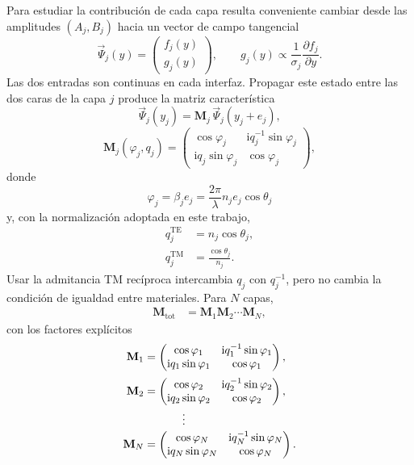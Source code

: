\documentclass[10pt,a4paper]{article}
\newcommand{\ii}{\mathrm{i}}
\newcommand{\M}{\mathbf{M}}
\newcommand{\vPsi}{\vec{\Psi}}
\begin{document}
Para estudiar la contribuci\'on de cada capa resulta conveniente cambiar desde las amplitudes $(A_j,B_j)$ hacia un vector de campo tangencial
\begin{equation}
\vPsi_j(y)=
\begin{pmatrix}
f_j(y)\\[2pt]
g_j(y)
\end{pmatrix},
\qquad
g_j(y)\propto\frac{1}{\sigma_j}\frac{\partial f_j}{\partial y}.
\label{eq:vector-estado}
\end{equation}
Las dos entradas son continuas en cada interfaz. Propagar este estado entre las dos caras de la capa $j$ produce la matriz caracter\'istica
\begin{equation}
\vPsi_j(y_j)=\M_j\,\vPsi_j(y_j+e_j),
\end{equation}
\begin{equation}
\M_j(\varphi_j,q_j)=
\begin{pmatrix}
\cos\varphi_j & \ii q_j^{-1}\sin\varphi_j\\[2pt]
\ii q_j\sin\varphi_j & \cos\varphi_j
\end{pmatrix},
\label{eq:matriz-capa}
\end{equation}
donde
\begin{equation}
\varphi_j=\beta_j e_j
=\frac{2\pi}{\lambda}n_je_j\cos\theta_j
\label{eq:fase}
\end{equation}
y, con la normalizaci\'on adoptada en este trabajo,
\begin{align}
q_j^{\mathrm{TE}}&=n_j\cos\theta_j,
\label{eq:qte}\\
q_j^{\mathrm{TM}}&=\frac{\cos\theta_j}{n_j}.
\label{eq:qtm}
\end{align}
Usar la admitancia TM rec\'iproca intercambia $q_j$ con $q_j^{-1}$, pero no cambia la condici\'on de igualdad entre materiales. Para $N$ capas,
\begin{align}
\M_{\mathrm{tot}}
&=\M_1\M_2\cdots\M_N,
\label{eq:producto-total}
\end{align}
con los factores expl\'icitos
\begin{align*}
\M_1&=
\begin{pmatrix}
\cos\varphi_1 & \ii q_1^{-1}\sin\varphi_1\\
\ii q_1\sin\varphi_1 & \cos\varphi_1
\end{pmatrix},\\[2pt]
\M_2&=
\begin{pmatrix}
\cos\varphi_2 & \ii q_2^{-1}\sin\varphi_2\\
\ii q_2\sin\varphi_2 & \cos\varphi_2
\end{pmatrix},\\[-2pt]
&\hspace{1.2cm}\vdots\\[-2pt]
\M_N&=
\begin{pmatrix}
\cos\varphi_N & \ii q_N^{-1}\sin\varphi_N\\
\ii q_N\sin\varphi_N & \cos\varphi_N
\end{pmatrix}.
\end{align*}
\end{document}
